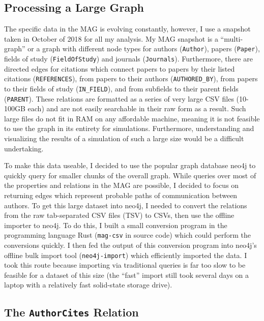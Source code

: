 \hypertarget{processing-a-large-graph}{%
\subsection{Processing a Large Graph}\label{processing-a-large-graph}}

The specific data in the MAG is evolving constantly, however, I use a
snapshot taken in October of 2018 for all my analysis. My MAG snapshot
is a ``multi-graph'' or a graph with different node types for authors
(\texttt{Author}), papers (\texttt{Paper}), fields of study
(\texttt{FieldOfStudy}) and journals (\texttt{Journals}). Furthermore,
there are directed edges for citations which connect papers to papers by
their listed citations (\texttt{REFERENCES}), from papers to their
authors (\texttt{AUTHORED\_BY}), from papers to their fields of study
(\texttt{IN\_FIELD}), and from subfields to their parent fields
(\texttt{PARENT}). These relations are formatted as a series of very
large CSV files (10-100GB each) and are not easily searchable in their
raw form as a result. Such large files do not fit in RAM on any
affordable machine, meaning it is not feasible to use the graph in its
entirety for simulations. Furthermore, understanding and visualizing the
results of a simulation of such a large size would be a difficult
undertaking.

To make this data useable, I decided to use the popular graph database
neo4j \autocite{Neo4j} to quickly query for smaller chunks of the
overall graph. While queries over most of the properties and relations
in the MAG are possible, I decided to focus on returning edges which
represent probable paths of communication between authors. To get this
large dataset into neo4j, I needed to convert the relations from the raw
tab-separated CSV files (TSV) to CSVs, then use the offline importer to
neo4j. To do this, I built a small conversion program in the programming
language Rust (\texttt{mag-csv} in source code) which could perform the
conversions quickly. I then fed the output of this conversion program
into neo4j's offline bulk import tool (\texttt{neo4j-import}) which
efficiently imported the data. I took this route because importing via
traditional queries is far too slow to be feasible for a dataset of this
size (the ``fast'' import still took several days on a laptop with a
relatively fast solid-state storage drive).

\hypertarget{the-authorcites-relation}{%
\subsection{\texorpdfstring{The \texttt{AuthorCites}
Relation}{The AuthorCites Relation}}\label{the-authorcites-relation}}

